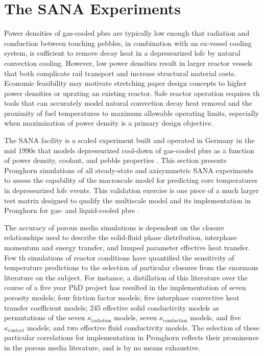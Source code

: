 \chapter{The SANA Experiments}
\label{sec:sana}

Power densities of gas-cooled \glspl{pbr} are typically low enough that radiation and conduction between touching pebbles, in combination with an ex-vessel cooling system, is sufficient to remove decay heat in a depressurized \gls{lofc} by natural convection cooling. However, low power densities result in larger reactor vessels that both complicate rail transport and increase structural material costs. Economic feasibility may motivate stretching paper design concepts to higher power densities or uprating an existing reactor. Safe reactor operation requires \gls{th} tools that can accurately model natural convection decay heat removal and the proximity of fuel temperatures to maximum allowable operating limits, especially when maximization of power density is a primary design objective. 

The SANA facility is a scaled experiment built and operated in Germany in the mid 1990s that models depressurized cool-down of gas-cooled \glspl{pbr} as a function of power density, coolant, and pebble properties \cite{SANA}. This section presents Pronghorn simulations of all steady-state and axisymmetric SANA experiments to assess the capability of the macroscale model for predicting core temperatures in depressurized \gls{lofc} events. This validation exercise is one piece of a much larger test matrix designed to qualify the multiscale model and its implementation in Pronghorn for gas- and liquid-cooled \glspl{pbr} \cite{ph_plan}.

The accuracy of porous media simulations is dependent on the closure relationships used to describe the solid-fluid phase distribution, interphase momentum and energy transfer, and lumped parameter effective heat transfer. Few \gls{th} simulations of reactor conditions have quantified the sensitivity of temperature predictions to the selection of particular closures from the enormous literature on the subject. For instance, a distillation of this literature over the course of a five year PhD project has resulted in the implementation of seven porosity models; four friction factor models; five interphase convective heat transfer coefficient models; 245 effective solid conductivity models as permutations of the seven \(\kappa_\text{radiation}\) models, seven \(\kappa_\text{conduction}\) models, and five \(\kappa_\text{contact}\) models; and two effective fluid conductivity models. The selection of these particular correlations for implementation in Pronghorn reflects their prominence in the porous media literature, and is by no means exhaustive. 

